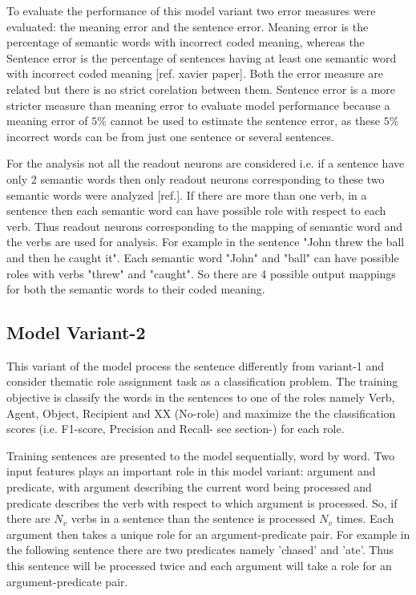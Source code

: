 To evaluate the performance of this model variant two error measures were evaluated: the meaning error and the sentence error. Meaning error is the percentage of semantic words with incorrect coded meaning, whereas the Sentence error is the percentage of sentences having at least one semantic word with incorrect coded meaning [ref. xavier paper]. Both the error measure are related but there is no strict corelation between them. Sentence error is a more stricter measure than meaning error to evaluate model performance because a meaning error of $5\%$ cannot be used to estimate the sentence error, as these $5\%$ incorrect words can be from just one sentence or several sentences. 

For the analysis not all the readout neurons are considered i.e. if a sentence have only 2 semantic words then only readout neurons corresponding to these two semantic words were analyzed [ref.]. If there are more than one verb, in a sentence then each semantic word can have possible role with respect to each verb. Thus readout neurons corresponding to the mapping of semantic word and the verbs are used for analysis. For example in the sentence "John threw the ball and then he caught it". Each semantic word "John" and "ball" can have possible roles with verbs "threw" and "caught". So there are 4 possible output mappings for both the semantic words to their coded meaning. 

\subsection{Model Variant-2}

This variant of the model process the sentence differently from variant-1 and consider thematic role assignment task as a classification problem. The training objective is classify the words in the sentences to one of the roles namely Verb, Agent, Object, Recipient and XX (No-role) and maximize the the classification scores (i.e. F1-score, Precision and Recall- see section-) for each role. 

Training sentences are presented to the model sequentially, word by word. Two input features plays an important role in this model variant: argument and predicate, with argument describing the current word being processed and predicate describes the verb with respect to which argument is processed. So, if there are $N_{v}$ verbs in a sentence than the sentence is processed $N_{v}$ times. Each argument then takes a unique role for an argument-predicate pair. For example in the following sentence there are two predicates namely 'chased' and 'ate'. Thus this sentence will be processed twice and each argument will take a role for an argument-predicate pair.

